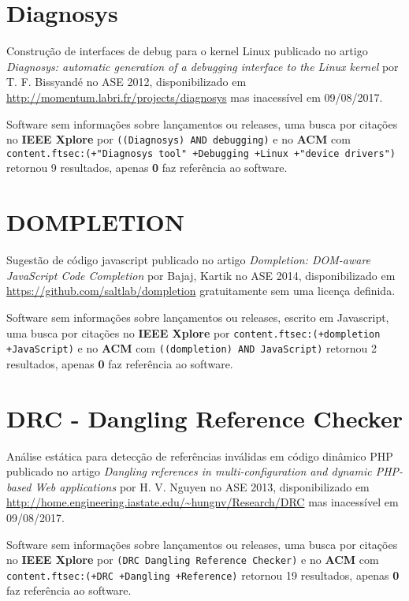 \section{Diagnosys}

Construção de interfaces de debug para o kernel Linux
publicado no artigo {\it Diagnosys: automatic generation of a debugging interface to the Linux kernel}
por T. F. Bissyandé
no ASE 2012,
disponibilizado em \url{http://momentum.labri.fr/projects/diagnosys}
mas inacessível em 09/08/2017.

Software sem informações sobre lançamentos ou releases,
uma busca por citações no {\bf IEEE Xplore} por
\texttt{((Diagnosys) AND debugging)}
e no {\bf ACM} com
\texttt{content.ftsec:(+"Diagnosys tool" +Debugging +Linux +"device drivers")}
retornou
9 resultados, apenas
{\bf 0} faz referência ao software.



\section{DOMPLETION}

Sugestão de código javascript
publicado no artigo {\it Dompletion: DOM-aware JavaScript Code Completion}
por Bajaj, Kartik
no ASE 2014,
disponibilizado em \url{https://github.com/saltlab/dompletion}
gratuitamente
sem uma licença definida.

Software sem informações sobre lançamentos ou releases,
escrito em Javascript,
uma busca por citações no {\bf IEEE Xplore} por
\texttt{content.ftsec:(+dompletion +JavaScript)}
e no {\bf ACM} com
\texttt{((dompletion) AND JavaScript)}
retornou
2 resultados, apenas
{\bf 0} faz referência ao software.



\section{DRC - Dangling Reference Checker}

Análise estática para detecção de referências inválidas em código dinâmico PHP
publicado no artigo {\it Dangling references in multi-configuration and dynamic PHP-based Web applications}
por H. V. Nguyen
no ASE 2013,
disponibilizado em \url{http://home.engineering.iastate.edu/~hungnv/Research/DRC}
mas inacessível em 09/08/2017.

Software sem informações sobre lançamentos ou releases,
uma busca por citações no {\bf IEEE Xplore} por
\texttt{(DRC Dangling Reference Checker)}
e no {\bf ACM} com
\texttt{content.ftsec:(+DRC +Dangling +Reference)}
retornou
19 resultados, apenas
{\bf 0} faz referência ao software.



